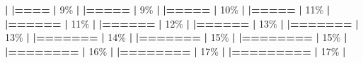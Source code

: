 \documentclass[
]{book}
\newenvironment{Shaded}{\begin{snugshade}}{\end{snugshade}}
\newcommand{\DecValTok}[1]{\textcolor[rgb]{0.00,0.00,0.81}{#1}}
\newcommand{\ErrorTok}[1]{\textcolor[rgb]{0.64,0.00,0.00}{\textbf{#1}}}
\newcommand{\NormalTok}[1]{#1}
\newcommand{\SpecialCharTok}[1]{\textcolor[rgb]{0.81,0.36,0.00}{\textbf{#1}}}
\begin{document}
\begin{Shaded}
\begin{Highlighting}[]
  \SpecialCharTok{|}                                                        
  \ErrorTok{|====}                                              \ErrorTok{|}   \DecValTok{9}\NormalTok{\%}
  \SpecialCharTok{|}                                                        
  \ErrorTok{|=====}                                             \ErrorTok{|}   \DecValTok{9}\NormalTok{\%}
  \SpecialCharTok{|}                                                        
  \ErrorTok{|=====}                                             \ErrorTok{|}  \DecValTok{10}\NormalTok{\%}
  \SpecialCharTok{|}                                                        
  \ErrorTok{|=====}                                             \ErrorTok{|}  \DecValTok{11}\NormalTok{\%}
  \SpecialCharTok{|}                                                        
  \ErrorTok{|======}                                            \ErrorTok{|}  \DecValTok{11}\NormalTok{\%}
  \SpecialCharTok{|}                                                        
  \ErrorTok{|======}                                            \ErrorTok{|}  \DecValTok{12}\NormalTok{\%}
  \SpecialCharTok{|}                                                        
  \ErrorTok{|======}                                            \ErrorTok{|}  \DecValTok{13}\NormalTok{\%}
  \SpecialCharTok{|}                                                        
  \ErrorTok{|=======}                                           \ErrorTok{|}  \DecValTok{13}\NormalTok{\%}
  \SpecialCharTok{|}                                                        
  \ErrorTok{|=======}                                           \ErrorTok{|}  \DecValTok{14}\NormalTok{\%}
  \SpecialCharTok{|}                                                        
  \ErrorTok{|=======}                                           \ErrorTok{|}  \DecValTok{15}\NormalTok{\%}
  \SpecialCharTok{|}                                                        
  \ErrorTok{|========}                                          \ErrorTok{|}  \DecValTok{15}\NormalTok{\%}
  \SpecialCharTok{|}                                                        
  \ErrorTok{|========}                                          \ErrorTok{|}  \DecValTok{16}\NormalTok{\%}
  \SpecialCharTok{|}                                                        
  \ErrorTok{|========}                                          \ErrorTok{|}  \DecValTok{17}\NormalTok{\%}
  \SpecialCharTok{|}                                                        
  \ErrorTok{|=========}                                         \ErrorTok{|}  \DecValTok{17}\NormalTok{\%}
  \SpecialCharTok{|}                                                        

\end{Highlighting}
\end{Shaded}
\end{document}
